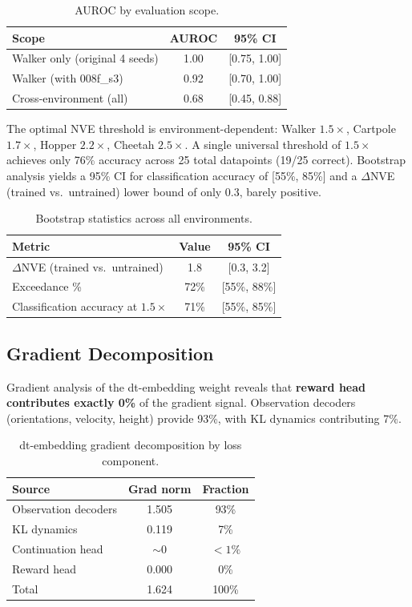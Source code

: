 \documentclass[10pt,twocolumn]{article}
\begin{document}
\begin{table}[h]
\centering
\caption{AUROC by evaluation scope.}
\label{tab:auroc}
\begin{tabular}{lcc}
\toprule
Scope & AUROC & 95\% CI \\
\midrule
Walker only (original 4 seeds) & 1.00 & [0.75, 1.00] \\
Walker (with 008f\_s3) & 0.92 & [0.70, 1.00] \\
Cross-environment (all) & 0.68 & [0.45, 0.88] \\
\bottomrule
\end{tabular}
\end{table}

The optimal NVE threshold is environment-dependent: Walker $1.5\times$, Cartpole $1.7\times$, Hopper $2.2\times$, Cheetah $2.5\times$. A single universal threshold of $1.5\times$ achieves only 76\% accuracy across 25 total datapoints (19/25 correct). Bootstrap analysis yields a 95\% CI for classification accuracy of [55\%, 85\%] and a $\Delta$NVE (trained vs.\ untrained) lower bound of only 0.3, barely positive.

\begin{table}[h]
\centering
\caption{Bootstrap statistics across all environments.}
\label{tab:bootstrap}
\begin{tabular}{lcc}
\toprule
Metric & Value & 95\% CI \\
\midrule
$\Delta$NVE (trained vs.\ untrained) & 1.8 & [0.3, 3.2] \\
Exceedance \% & 72\% & [55\%, 88\%] \\
Classification accuracy at $1.5\times$ & 71\% & [55\%, 85\%] \\
\bottomrule
\end{tabular}
\end{table}

\subsection{Gradient Decomposition}
\label{sec:gradient}

Gradient analysis of the dt-embedding weight reveals that \textbf{reward head contributes exactly 0\%} of the gradient signal. Observation decoders (orientations, velocity, height) provide 93\%, with KL dynamics contributing 7\%.

\begin{table}[h]
\centering
\caption{dt-embedding gradient decomposition by loss component.}
\label{tab:gradient}
\begin{tabular}{lcc}
\toprule
Source & Grad norm & Fraction \\
\midrule
Observation decoders & 1.505 & 93\% \\
KL dynamics & 0.119 & 7\% \\
Continuation head & $\sim 0$ & $<1\%$ \\
Reward head & 0.000 & 0\% \\
\midrule
Total & 1.624 & 100\% \\
\bottomrule
\end{tabular}
\end{table}
\end{document}
